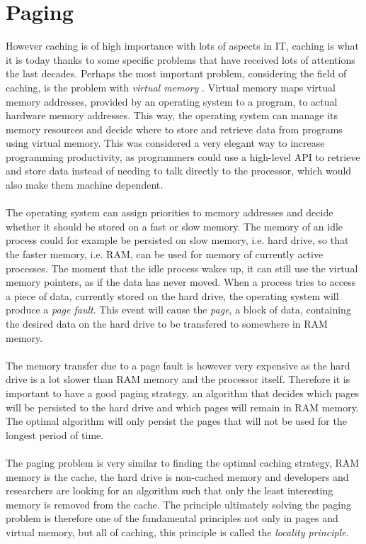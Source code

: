 \documentclass[pdftex,a4paper,12pt,twoside]{report}
\begin{document}
\section{Paging}
However caching is of high importance with lots of aspects in IT, caching is what it is today thanks to some specific problems that have received lots of attentions the last decades. Perhaps the most important problem, considering the field of caching, is the problem with \emph{virtual memory} \citep{denning1970virtual}. Virtual memory maps virtual memory addresses, provided by an operating system to a program, to actual hardware memory addresses. This way, the operating system can manage its memory resources and decide where to store and retrieve data from programs using virtual memory. This was considered a very elegant way to increase programming productivity, as programmers could use a high-level API to retrieve and store data instead of needing to talk directly to the processor, which would also make them machine dependent.
\\\\
The operating system can assign priorities to memory addresses and decide whether it should be stored on a fast or slow memory. The memory of an idle process could for example be persisted on slow memory, i.e. hard drive, so that the faster memory, i.e. RAM, can be used for memory of currently active processes. The moment that the idle process wakes up, it can still use the virtual memory pointers, as if the data has never moved. When a process tries to access a piece of data, currently stored on the hard drive, the operating system will produce a \emph{page fault}. This event will cause the \emph{page}, a block of data, containing the desired data on the hard drive to be transfered to somewhere in RAM memory.
\\\\
The memory transfer due to a page fault is however very expensive as the hard drive is a lot slower than RAM memory and the processor itself. Therefore it is important to have a good paging strategy, an algorithm that decides which pages will be persisted to the hard drive and which pages will remain in RAM memory. The optimal algorithm will only persist the pages that will not be used for the longest period of time.
\\\\
The paging problem is very similar to finding the optimal caching strategy, RAM memory is the cache, the hard drive is non-cached memory and developers and researchers are looking for an algorithm such that only the least interesting memory is removed from the cache. The principle ultimately solving the paging problem is therefore one of the fundamental principles not only in pages and virtual memory, but all of caching, this principle is called the \emph{locality principle}.
\\\\
\end{document}
